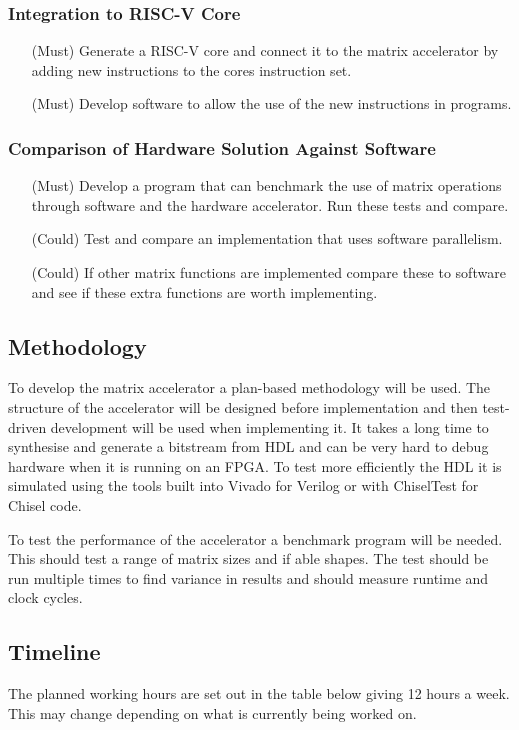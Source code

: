 \subsubsection{Integration to RISC-V Core}
\begin{enumerate}
	\item [(Must)] Generate a RISC-V core and connect it to the matrix accelerator by adding new instructions to the cores instruction set.
	\item [(Must)] Develop software to allow the use of the new instructions in programs.
\end{enumerate}
\subsubsection{Comparison of Hardware Solution Against Software}
\begin{enumerate}
	\item [(Must)] Develop a program that can benchmark the use of matrix operations through software and the hardware accelerator. Run these tests and compare.
	\item [(Could)] Test and compare an implementation that uses software parallelism.
	\item [(Could)] If other matrix functions are implemented compare these to software and see if these extra functions are worth implementing.
\end{enumerate}

\newpage			
\subsection{Methodology}
To develop the matrix accelerator a plan-based methodology will be used. The structure of the accelerator will be designed before implementation and then test-driven development will be used when implementing it. It takes a long time to synthesise and generate a bitstream from HDL and can be very hard to debug hardware when it is running on an FPGA. To test more efficiently the HDL it is simulated using the tools built into Vivado for Verilog or with ChiselTest for Chisel code.

To test the performance of the accelerator a benchmark program will be needed. This should test a range of matrix sizes and if able shapes. The test should be run multiple times to find variance in results and should measure runtime and clock cycles.

\subsection{Timeline}
The planned working hours are set out in the table below giving 12 hours a week. This may change depending on what is currently being worked on.

